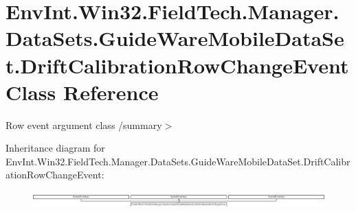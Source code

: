 \hypertarget{class_env_int_1_1_win32_1_1_field_tech_1_1_manager_1_1_data_sets_1_1_guide_ware_mobile_data_set_aa92b3413cef1716fa2c99ea466ba9d7}{}\section{Env\+Int.\+Win32.\+Field\+Tech.\+Manager.\+Data\+Sets.\+Guide\+Ware\+Mobile\+Data\+Set.\+Drift\+Calibration\+Row\+Change\+Event Class Reference}
\label{class_env_int_1_1_win32_1_1_field_tech_1_1_manager_1_1_data_sets_1_1_guide_ware_mobile_data_set_aa92b3413cef1716fa2c99ea466ba9d7}


Row event argument class /summary$>$  


Inheritance diagram for Env\+Int.\+Win32.\+Field\+Tech.\+Manager.\+Data\+Sets.\+Guide\+Ware\+Mobile\+Data\+Set.\+Drift\+Calibration\+Row\+Change\+Event\+:\begin{figure}[H]
\begin{center}
\leavevmode
\includegraphics[height=0.621187cm]{class_env_int_1_1_win32_1_1_field_tech_1_1_manager_1_1_data_sets_1_1_guide_ware_mobile_data_set_aa92b3413cef1716fa2c99ea466ba9d7}
\end{center}
\end{figure}
